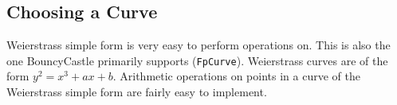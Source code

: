 \subsection{Choosing a Curve}

Weierstrass simple form is very easy to perform operations on. This is also the one
BouncyCastle primarily supports (\verb|FpCurve|). Weierstrass curves are of the form
\(y^2 = x^3 + ax + b\). Arithmetic operations on points in a curve of the Weierstrass
simple form are fairly easy to implement.

